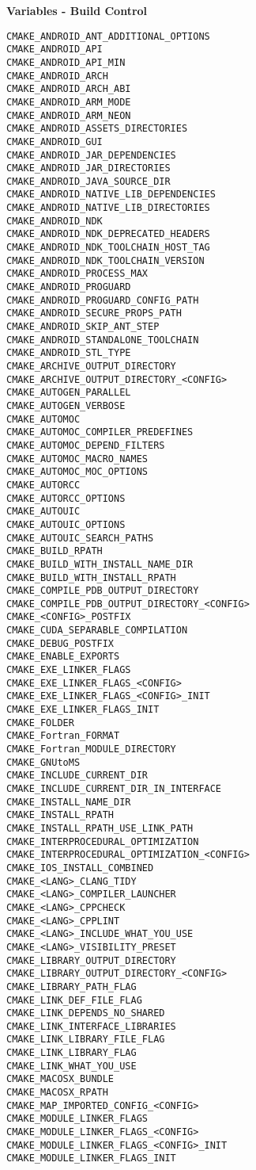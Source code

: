 \documentclass{article}
\begin{document}
\begin{minipage}[t]{0.18\linewidth}
\textbf{Variables - Build Control}
\begin{verbatim}
CMAKE_ANDROID_ANT_ADDITIONAL_OPTIONS
CMAKE_ANDROID_API
CMAKE_ANDROID_API_MIN
CMAKE_ANDROID_ARCH
CMAKE_ANDROID_ARCH_ABI
CMAKE_ANDROID_ARM_MODE
CMAKE_ANDROID_ARM_NEON
CMAKE_ANDROID_ASSETS_DIRECTORIES
CMAKE_ANDROID_GUI
CMAKE_ANDROID_JAR_DEPENDENCIES
CMAKE_ANDROID_JAR_DIRECTORIES
CMAKE_ANDROID_JAVA_SOURCE_DIR
CMAKE_ANDROID_NATIVE_LIB_DEPENDENCIES
CMAKE_ANDROID_NATIVE_LIB_DIRECTORIES
CMAKE_ANDROID_NDK
CMAKE_ANDROID_NDK_DEPRECATED_HEADERS
CMAKE_ANDROID_NDK_TOOLCHAIN_HOST_TAG
CMAKE_ANDROID_NDK_TOOLCHAIN_VERSION
CMAKE_ANDROID_PROCESS_MAX
CMAKE_ANDROID_PROGUARD
CMAKE_ANDROID_PROGUARD_CONFIG_PATH
CMAKE_ANDROID_SECURE_PROPS_PATH
CMAKE_ANDROID_SKIP_ANT_STEP
CMAKE_ANDROID_STANDALONE_TOOLCHAIN
CMAKE_ANDROID_STL_TYPE
CMAKE_ARCHIVE_OUTPUT_DIRECTORY
CMAKE_ARCHIVE_OUTPUT_DIRECTORY_<CONFIG>
CMAKE_AUTOGEN_PARALLEL
CMAKE_AUTOGEN_VERBOSE
CMAKE_AUTOMOC
CMAKE_AUTOMOC_COMPILER_PREDEFINES
CMAKE_AUTOMOC_DEPEND_FILTERS
CMAKE_AUTOMOC_MACRO_NAMES
CMAKE_AUTOMOC_MOC_OPTIONS
CMAKE_AUTORCC
CMAKE_AUTORCC_OPTIONS
CMAKE_AUTOUIC
CMAKE_AUTOUIC_OPTIONS
CMAKE_AUTOUIC_SEARCH_PATHS
CMAKE_BUILD_RPATH
CMAKE_BUILD_WITH_INSTALL_NAME_DIR
CMAKE_BUILD_WITH_INSTALL_RPATH
CMAKE_COMPILE_PDB_OUTPUT_DIRECTORY
CMAKE_COMPILE_PDB_OUTPUT_DIRECTORY_<CONFIG>
CMAKE_<CONFIG>_POSTFIX
CMAKE_CUDA_SEPARABLE_COMPILATION
CMAKE_DEBUG_POSTFIX
CMAKE_ENABLE_EXPORTS
CMAKE_EXE_LINKER_FLAGS
CMAKE_EXE_LINKER_FLAGS_<CONFIG>
CMAKE_EXE_LINKER_FLAGS_<CONFIG>_INIT
CMAKE_EXE_LINKER_FLAGS_INIT
CMAKE_FOLDER
CMAKE_Fortran_FORMAT
CMAKE_Fortran_MODULE_DIRECTORY
CMAKE_GNUtoMS
CMAKE_INCLUDE_CURRENT_DIR
CMAKE_INCLUDE_CURRENT_DIR_IN_INTERFACE
CMAKE_INSTALL_NAME_DIR
CMAKE_INSTALL_RPATH
CMAKE_INSTALL_RPATH_USE_LINK_PATH
CMAKE_INTERPROCEDURAL_OPTIMIZATION
CMAKE_INTERPROCEDURAL_OPTIMIZATION_<CONFIG>
CMAKE_IOS_INSTALL_COMBINED
CMAKE_<LANG>_CLANG_TIDY
CMAKE_<LANG>_COMPILER_LAUNCHER
CMAKE_<LANG>_CPPCHECK
CMAKE_<LANG>_CPPLINT
CMAKE_<LANG>_INCLUDE_WHAT_YOU_USE
CMAKE_<LANG>_VISIBILITY_PRESET
CMAKE_LIBRARY_OUTPUT_DIRECTORY
CMAKE_LIBRARY_OUTPUT_DIRECTORY_<CONFIG>
CMAKE_LIBRARY_PATH_FLAG
CMAKE_LINK_DEF_FILE_FLAG
CMAKE_LINK_DEPENDS_NO_SHARED
CMAKE_LINK_INTERFACE_LIBRARIES
CMAKE_LINK_LIBRARY_FILE_FLAG
CMAKE_LINK_LIBRARY_FLAG
CMAKE_LINK_WHAT_YOU_USE
CMAKE_MACOSX_BUNDLE
CMAKE_MACOSX_RPATH
CMAKE_MAP_IMPORTED_CONFIG_<CONFIG>
CMAKE_MODULE_LINKER_FLAGS
CMAKE_MODULE_LINKER_FLAGS_<CONFIG>
CMAKE_MODULE_LINKER_FLAGS_<CONFIG>_INIT
CMAKE_MODULE_LINKER_FLAGS_INIT
\end{verbatim}
\end{minipage}
\end{document}
